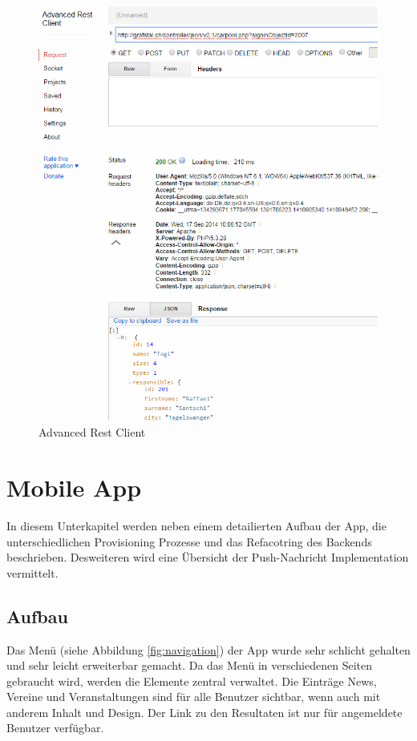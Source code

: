 \begin{figure}[h]
\centering
\includegraphics[scale=0.5]{images/advanced_rest_client.png}
\caption{Advanced Rest Client}
\label{fig:advanced_rest_client}
\end{figure}

\FloatBarrier


\clearpage
\section{Mobile App}\label{impl_moblie_app}
In diesem Unterkapitel werden neben einem detailierten Aufbau der App, die unterschiedlichen Provisioning Prozesse und das Refacotring des Backends beschrieben. Desweiteren wird eine Übersicht der Push-Nachricht Implementation vermittelt.

\subsection{Aufbau}
Das Menü (siehe Abbildung \ref{fig:navigation}) der App wurde sehr schlicht gehalten und sehr leicht erweiterbar gemacht. Da das Menü in verschiedenen Seiten gebraucht wird, werden die Elemente zentral verwaltet. Die Einträge News, Vereine und Veranstaltungen sind für alle Benutzer sichtbar, wenn auch mit anderem Inhalt und Design. Der Link zu den Resultaten ist nur für angemeldete Benutzer verfügbar.

